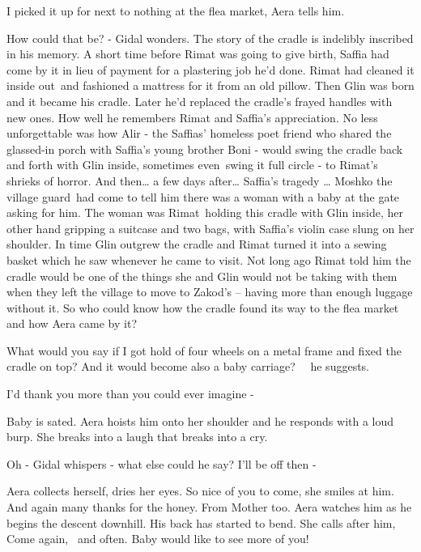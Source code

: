 \documentclass[12pt]{book}
\begin{document}
{\textquotedbl}I picked it up for next to nothing at the flea market,{\textquotedbl} Aera tells
him{.}

How could that be? - Gidal wonders. The story of the cradle is indelibly inscribed in his memory. A short time before
Rimat was going to give birth, Saffia had come by it in lieu of payment for a plastering
job{ }he'd done. Rimat had cleaned it inside out~and fashioned a mattress for
it from an old pillow. Then Glin was born and it became his cradle. Later he'd replaced the cradle's frayed handles
with new ones. How well he remembers Rimat and Saffia's appreciation. No less unforgettable was how Alir - the Saffias'
homeless poet friend who shared the glassed-in porch with Saffia's young brother Boni - would swing the cradle back and
forth with Glin inside, sometimes even~swing it full circle - to Rimat's shrieks of horror. And then{\dots} a few days
after{\dots} Saffia's tragedy {\dots} Moshko the village guard~had come to tell him there was a woman with a baby at
the gate asking for him. The woman was Rimat~holding this cradle with Glin inside, her other hand gripping a suitcase
and two bags, with{ }Saffia's violin case slung on her shoulder. In time Glin
outgrew the cradle and Rimat turned it into a sewing basket which he saw whenever he came to visit. Not long ago Rimat
told him the cradle would be one of the things she and Glin would not be taking with them when they left the village to
move to Zakod's {{}--} having more than enough luggage without it. So who could
know how the cradle found its way to the flea market and how Aera came by it?

{\textquotedbl}What would you say if I got hold of four wheels on a metal frame and fixed the cradle on top? And it
would become also a baby carriage?{\textquotedbl} \ \ he suggests.

{\textquotedbl}I'd thank you more than you could ever imagine -{\textquotedbl}

Baby is sated. Aera hoists him onto her shoulder and he responds with a loud burp. She breaks into a laugh that breaks
into a cry.

{\textquotedbl}Oh -{\textquotedbl} Gidal whispers - what else could he say? {\textquotedbl}I'll be off then
-{\textquotedbl}

Aera collects herself, dries her eyes. {\textquotedbl}So nice of you to come,{\textquotedbl} she smiles at him.
{\textquotedbl}And again many thanks for the honey. From Mother too.{\textquotedbl} Aera watches him as he begins the
descent downhill. His back has started to bend. She calls after him, {\textquotedbl}Come again, \ and often. Baby would
like to see more of you!{\textquotedbl}
\end{document}
